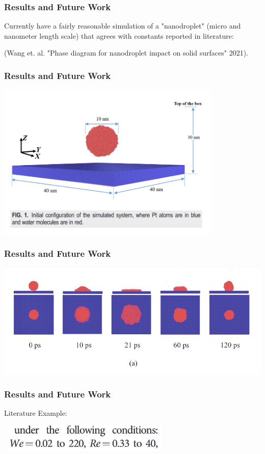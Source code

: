 \documentclass[12pt]{beamer}
\begin{document}
\begin{frame}
    \frametitle{Results and Future Work}
    Currently have a fairly reasonable simulation of a "nanodroplet" (micro and
    nanometer length scale) that agrees with constants reported in literature:
    
    (Wang et. al. "Phase diagram for nanodroplet impact on solid surfaces" 2021).
\end{frame}
\begin{frame}
    \frametitle{Results and Future Work}
    \includegraphics[width=0.8\textwidth]{img/wang-3d.png}
\end{frame}
\begin{frame}
    \frametitle{Results and Future Work}
    \includegraphics[width=\textwidth]{img/wang-sim.png}
\end{frame}
\begin{frame}
    \frametitle{Results and Future Work}
    Literature Example:

    \
    \includegraphics[width=0.6\textwidth]{img/wang-constants.png}
\end{frame}
\end{document}
